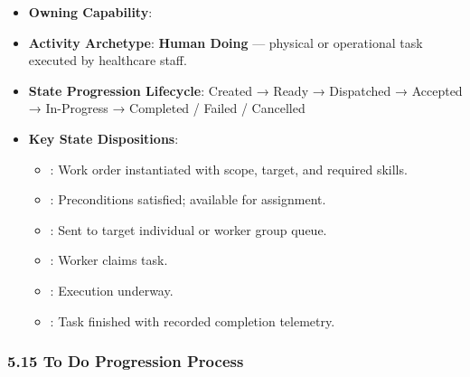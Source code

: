 \begin{itemize}

\item 
\textbf{Owning Capability}: \texttt{}



\item 
\textbf{Activity Archetype}: \textbf{Human Doing} — physical or operational task executed by healthcare staff.



\item 
\textbf{State Progression Lifecycle}: Created → Ready → Dispatched → Accepted → In-Progress → Completed /\allowbreak{} Failed /\allowbreak{} Cancelled



\item 
\textbf{Key State Dispositions}:


\begin{itemize}

\item 
\texttt{}: Work order instantiated with scope, target, and required skills.



\item 
\texttt{}: Preconditions satisfied; available for assignment.



\item 
\texttt{}: Sent to target individual or worker group queue.



\item 
\texttt{}: Worker claims task.



\item 
\texttt{}: Execution underway.



\item 
\texttt{}: Task finished with recorded completion telemetry.



\end{itemize}


\end{itemize}
\label{rad:processes:295}

\par\smallskip
{}\label{rad:processes:297}
\subsubsection*{5.15 To Do Progression Process}
\label{rad:processes:298}

